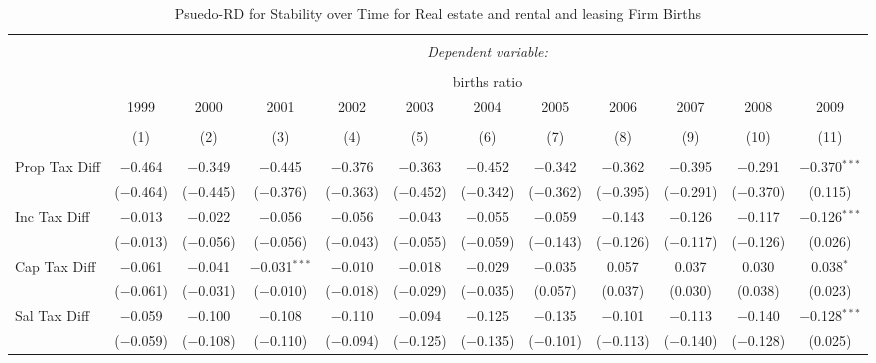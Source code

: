 
\begin{table}[!htbp] \centering 
  \caption{Psuedo-RD for Stability over Time for  Real estate and rental and leasing Firm Births} 
  \label{53year} 
\small 
\begin{tabular}{@{\extracolsep{5pt}}lccccccccccc} 
\\[-1.8ex]\hline 
\hline \\[-1.8ex] 
 & \multicolumn{11}{c}{\textit{Dependent variable:}} \\ 
\cline{2-12} 
\\[-1.8ex] & \multicolumn{11}{c}{births ratio} \\ 
 & 1999 & 2000 & 2001 & 2002 & 2003 & 2004 & 2005 & 2006 & 2007 & 2008 & 2009 \\ 
\\[-1.8ex] & (1) & (2) & (3) & (4) & (5) & (6) & (7) & (8) & (9) & (10) & (11)\\ 
\hline \\[-1.8ex] 
 Prop Tax Diff & $-$0.464 & $-$0.349 & $-$0.445 & $-$0.376 & $-$0.363 & $-$0.452 & $-$0.342 & $-$0.362 & $-$0.395 & $-$0.291 & $-$0.370$^{***}$ \\ 
  & ($-$0.464) & ($-$0.445) & ($-$0.376) & ($-$0.363) & ($-$0.452) & ($-$0.342) & ($-$0.362) & ($-$0.395) & ($-$0.291) & ($-$0.370) & (0.115) \\ 
  Inc Tax Diff & $-$0.013 & $-$0.022 & $-$0.056 & $-$0.056 & $-$0.043 & $-$0.055 & $-$0.059 & $-$0.143 & $-$0.126 & $-$0.117 & $-$0.126$^{***}$ \\ 
  & ($-$0.013) & ($-$0.056) & ($-$0.056) & ($-$0.043) & ($-$0.055) & ($-$0.059) & ($-$0.143) & ($-$0.126) & ($-$0.117) & ($-$0.126) & (0.026) \\ 
  Cap Tax Diff & $-$0.061 & $-$0.041 & $-$0.031$^{***}$ & $-$0.010 & $-$0.018 & $-$0.029 & $-$0.035 & 0.057 & 0.037 & 0.030 & 0.038$^{*}$ \\ 
  & ($-$0.061) & ($-$0.031) & ($-$0.010) & ($-$0.018) & ($-$0.029) & ($-$0.035) & (0.057) & (0.037) & (0.030) & (0.038) & (0.023) \\ 
  Sal Tax Diff & $-$0.059 & $-$0.100 & $-$0.108 & $-$0.110 & $-$0.094 & $-$0.125 & $-$0.135 & $-$0.101 & $-$0.113 & $-$0.140 & $-$0.128$^{***}$ \\ 
  & ($-$0.059) & ($-$0.108) & ($-$0.110) & ($-$0.094) & ($-$0.125) & ($-$0.135) & ($-$0.101) & ($-$0.113) & ($-$0.140) & ($-$0.128) & (0.025) \\ 

\end{tabular}
\end{table}
